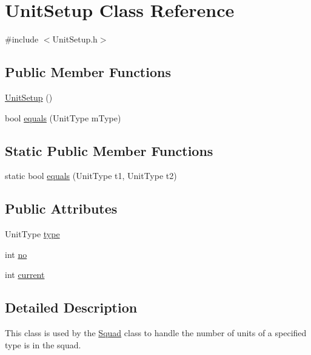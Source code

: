 \hypertarget{class_unit_setup}{\section{Unit\-Setup Class Reference}
\label{class_unit_setup}
}


{\ttfamily \#include $<$Unit\-Setup.\-h$>$}

\subsection*{Public Member Functions}
\begin{DoxyCompactItemize}
\item 
\hyperlink{class_unit_setup_a1bec8d24f24962c9afdcc655f37b2741}{Unit\-Setup} ()
\item 
bool \hyperlink{class_unit_setup_abf6d1d46a221ed56e5b2274bca316403}{equals} (Unit\-Type m\-Type)
\end{DoxyCompactItemize}
\subsection*{Static Public Member Functions}
\begin{DoxyCompactItemize}
\item 
static bool \hyperlink{class_unit_setup_a1415108dca9b17a61eabf2da040f8daf}{equals} (Unit\-Type t1, Unit\-Type t2)
\end{DoxyCompactItemize}
\subsection*{Public Attributes}
\begin{DoxyCompactItemize}
\item 
Unit\-Type \hyperlink{class_unit_setup_a6665631fe1080c31e51ac58bd17a9741}{type}
\item 
int \hyperlink{class_unit_setup_aed8c7114cbebda909c5ecaed720075a4}{no}
\item 
int \hyperlink{class_unit_setup_a4a820e914895b448ad20912421d99ee7}{current}
\end{DoxyCompactItemize}


\subsection{Detailed Description}
This class is used by the \hyperlink{class_squad}{Squad} class to handle the number of units of a specified type is in the squad.

